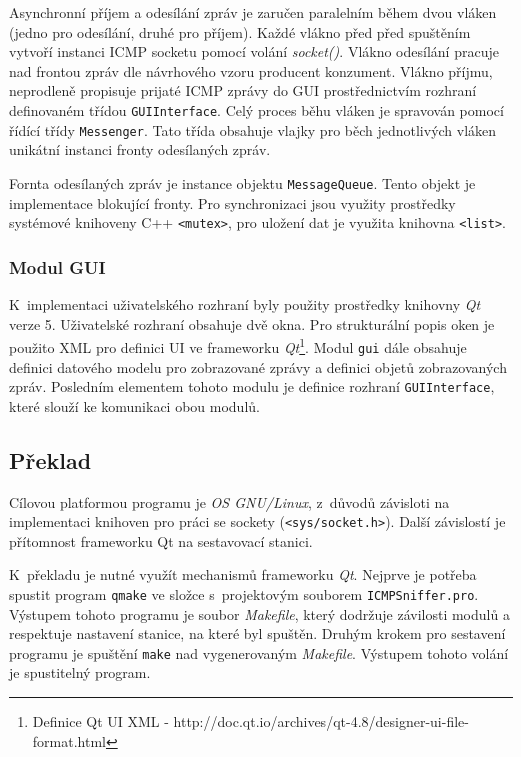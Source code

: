 \documentclass[12pt, a4paper]{article}
\begin{document}
Asynchronní příjem a odesílání zpráv je zaručen paralelním během dvou vláken (jedno pro odesílání, druhé pro příjem). Každé vlákno před před spuštěním vytvoří instanci ICMP socketu pomocí volání \emph{socket()}. Vlákno odesílání pracuje nad frontou zpráv dle návrhového vzoru producent konzument. Vlákno příjmu, neprodleně propisuje prijaté ICMP zprávy do GUI prostřednictvím rozhraní definovaném třídou \texttt{GUIInterface}. Celý proces běhu vláken je spravován pomocí řídící třídy \texttt{Messenger}. Tato třída obsahuje vlajky pro běch jednotlivých vláken unikátní instanci fronty odesílaných zpráv.

Fornta odesílaných zpráv je instance objektu \texttt{MessageQueue}. Tento objekt je implementace blokující fronty. Pro synchronizaci jsou využity prostředky systémové knihoveny C++ \texttt{<mutex>}, pro uložení dat je využita knihovna \texttt{<list>}.

\subsubsection{Modul GUI}

K~implementaci uživatelského rozhraní byly použity prostředky knihovny \emph{Qt} verze 5. Uživatelské rozhraní obsahuje dvě okna. Pro strukturální popis oken je použito XML pro definici UI ve frameworku \emph{Qt}\footnote{Definice Qt UI XML - http://doc.qt.io/archives/qt-4.8/designer-ui-file-format.html}. Modul \texttt{gui} dále obsahuje definici datového modelu pro zobrazované zprávy a definici objetů zobrazovaných zpráv. Posledním elementem tohoto modulu je definice rozhraní \texttt{GUIInterface}, které slouží ke komunikaci obou modulů.

\subsection{Překlad}

Cílovou platformou programu je \emph{OS GNU/Linux}, z~důvodů závisloti na implementaci knihoven pro práci se sockety (\texttt{<sys/socket.h>}). Další závislostí je přítomnost frameworku Qt na sestavovací stanici.

K~překladu je nutné využít mechanismů frameworku \emph{Qt}. Nejprve je potřeba spustit program \texttt{qmake} ve složce s~projektovým souborem \texttt{ICMPSniffer.pro}. Výstupem tohoto programu je soubor \emph{Makefile}, který dodržuje závilosti modulů a respektuje nastavení stanice, na které byl spuštěn. Druhým krokem pro sestavení programu je spuštění \texttt{make} nad vygenerovaným \emph{Makefile}. Výstupem tohoto volání je spustitelný program.
\end{document}
